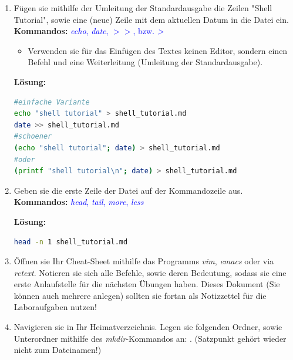 \documentclass[paper=a4,fontsize=11pt]{scrartcl}%
\numberwithin{equation}{section}
\newenvironment{solution}
	{
		\color{blue}
		\textbf{Lösung:}
	}{}
\begin{document}
\begin{enumerate}
\begin{enumerate}[label=(\alph*)]
		\begin{solution}
        \begin{lstlisting}[style=Bash, language=Bash]
du -h shell_tutorial.md # Groesse in Bytes auf der Platte, 4KB ist die Standardblockgroesse, auch wenn die Datei kleiner ist.
ls -la shell_tutorial.md #in Bytes vor dem Datum
stat shell_tutorial.md # wie bei du
		\end{lstlisting}
		\end{solution}
		\item Fügen sie mithilfe der Umleitung der Standardausgabe die Zeilen "Shell Tutorial", sowie eine (neue) Zeile mit dem aktuellen Datum in die Datei  ein.\\
		\textbf{Kommandos:} \textcolor{blue}{\emph{echo}, \emph{date}, $>>$, bzw. \emph{>}}
		\begin{itemize}
			\item \small Verwenden sie für das Einfügen des Textes keinen Editor, sondern einen Befehl und eine Weiterleitung (Umleitung der Standardausgabe).
		\end{itemize}
		
		\begin{solution}
        \begin{lstlisting}[style=Bash, language=Bash]
#einfache Variante
echo "shell tutorial" > shell_tutorial.md
date >> shell_tutorial.md
#schoener
(echo "shell tutorial"; date) > shell_tutorial.md
#oder
(printf "shell tutorial\n"; date) > shell_tutorial.md
		\end{lstlisting}
		\end{solution}
		\item Geben sie die erste Zeile der Datei  auf der Kommandozeile aus.\\
		\textbf{Kommandos:} \textcolor{blue}{\emph{head}, \emph{tail}, \emph{more}, \emph{less}}
		
		\begin{solution}
        \begin{lstlisting}[style=Bash, language=Bash]
head -n 1 shell_tutorial.md
		\end{lstlisting}
		\end{solution}
		\item Öffnen sie Ihr Cheat-Sheet mithilfe das Programms \emph{vim}, \emph{emacs} oder via \emph{retext}. Notieren sie sich alle Befehle, sowie deren Bedeutung, sodass sie eine erste Anlaufstelle für die nächsten Übungen haben. Dieses Dokument (Sie können auch mehrere anlegen) sollten sie fortan als Notizzettel für die Laboraufgaben nutzen!
		\item Navigieren sie in Ihr Heimatverzeichnis. Legen sie folgenden Ordner, sowie Unterordner mithilfe des \emph{mkdir}-Kommandos an: . (Satzpunkt gehört wieder nicht zum Dateinamen!)
		

\end{enumerate}
\end{enumerate}
\end{document}
